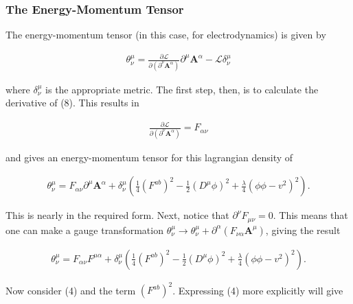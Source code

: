 \documentclass[fleqn, twocolumn, 10pt]{article}
\begin{document}
\subsubsection{The Energy-Momentum Tensor}

The energy-momentum tensor (in this case, for electrodynamics) is given by \cite{purdy2018QFT, schwartz2014quantum, maggiore2005modern}

\begin{ceqn}
\begin{align*}
\theta^{\mu}_{\nu} = \frac{\partial \mathcal{L}}{\partial(\partial^\nu\bm{A}^\alpha )}\partial^\mu\bm{A}^\alpha -\mathcal{L}\delta^{\mu}_{\nu}
\end{align*}
\end{ceqn}
where $\delta^\mu_{\nu}$ is the appropriate metric. The first step, then, is to calculate the derivative of (8). This results in

\begin{ceqn}
\begin{align*}
\frac{\partial \mathcal{L}}{\partial(\partial^\nu\bm{A}^\alpha )} = F_{\alpha\nu}
\end{align*}
\end{ceqn}
and gives an energy-momentum tensor for this lagrangian density of

\begin{ceqn}
\begin{align*}
\theta^{\mu}_{\nu} = F_{\alpha\nu} \partial^\mu\bm{A}^\alpha + \delta^{\mu}_{\nu}\left(\frac{1}{4}(F^{ab})^2 - \frac{1}{2} (D^\mu \phi)^2 + \frac{\lambda}{4}(\phi \phi - v^2)^2\right).
\end{align*}
\end{ceqn}
This is nearly in the required form. Next, notice that $\partial^\nu F_{\mu\nu} = 0$. This means that one can make a gauge transformation \cite{maggiore2005modern} $\theta^{\mu}_{\nu} \to \theta^{\mu}_{\nu} + \partial^\alpha (F_{\nu\alpha}\bm{A}^\mu)$, giving the result

\begin{ceqn}
\begin{align*}
\theta^{\mu}_{\nu} = F_{\alpha\nu}F^{\mu\alpha} + \delta^{\mu}_{\nu}\left(\frac{1}{4}(F^{ab})^2 - \frac{1}{2} (D^\mu \phi)^2 + \frac{\lambda}{4}(\phi \phi - v^2)^2\right).
\end{align*}
\end{ceqn}

Now consider (4) and the term $(F^{ab})^2$. Expressing (4) more explicitly will give 
\end{document}
